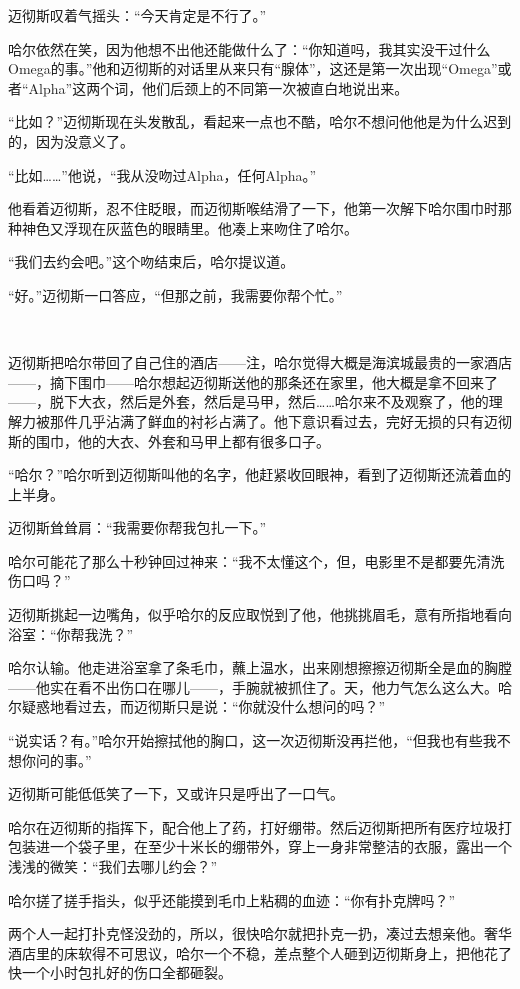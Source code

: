 \documentclass[../main]{subfiles}
\begin{document}
迈彻斯叹着气摇头：“今天肯定是不行了。”

哈尔依然在笑，因为他想不出他还能做什么了：“你知道吗，我其实没干过什么Omega的事。”他和迈彻斯的对话里从来只有“腺体”，这还是第一次出现“Omega”或者“Alpha”这两个词，他们后颈上的不同第一次被直白地说出来。

“比如？”迈彻斯现在头发散乱，看起来一点也不酷，哈尔不想问他他是为什么迟到的，因为没意义了。

“比如……”他说，“我从没吻过Alpha，任何Alpha。”

他看着迈彻斯，忍不住眨眼，而迈彻斯喉结滑了一下，他第一次解下哈尔围巾时那种神色又浮现在灰蓝色的眼睛里。他凑上来吻住了哈尔。

“我们去约会吧。”这个吻结束后，哈尔提议道。

“好。”迈彻斯一口答应，“但那之前，我需要你帮个忙。”

~\

迈彻斯把哈尔带回了自己住的酒店——注，哈尔觉得大概是海滨城最贵的一家酒店——，摘下围巾——哈尔想起迈彻斯送他的那条还在家里，他大概是拿不回来了——，脱下大衣，然后是外套，然后是马甲，然后……哈尔来不及观察了，他的理解力被那件几乎沾满了鲜血的衬衫占满了。他下意识看过去，完好无损的只有迈彻斯的围巾，他的大衣、外套和马甲上都有很多口子。

“哈尔？”哈尔听到迈彻斯叫他的名字，他赶紧收回眼神，看到了迈彻斯还流着血的上半身。

迈彻斯耸耸肩：“我需要你帮我包扎一下。”

哈尔可能花了那么十秒钟回过神来：“我不太懂这个，但，电影里不是都要先清洗伤口吗？”

迈彻斯挑起一边嘴角，似乎哈尔的反应取悦到了他，他挑挑眉毛，意有所指地看向浴室：“你帮我洗？”

哈尔认输。他走进浴室拿了条毛巾，蘸上温水，出来刚想擦擦迈彻斯全是血的胸膛——他实在看不出伤口在哪儿——，手腕就被抓住了。天，他力气怎么这么大。哈尔疑惑地看过去，而迈彻斯只是说：“你就没什么想问的吗？”

“说实话？有。”哈尔开始擦拭他的胸口，这一次迈彻斯没再拦他，“但我也有些我不想你问的事。”

迈彻斯可能低低笑了一下，又或许只是呼出了一口气。

哈尔在迈彻斯的指挥下，配合他上了药，打好绷带。然后迈彻斯把所有医疗垃圾打包装进一个袋子里，在至少十米长的绷带外，穿上一身非常整洁的衣服，露出一个浅浅的微笑：“我们去哪儿约会？”

哈尔搓了搓手指头，似乎还能摸到毛巾上粘稠的血迹：“你有扑克牌吗？”

两个人一起打扑克怪没劲的，所以，很快哈尔就把扑克一扔，凑过去想亲他。奢华酒店里的床软得不可思议，哈尔一个不稳，差点整个人砸到迈彻斯身上，把他花了快一个小时包扎好的伤口全都砸裂。
\end{document}
